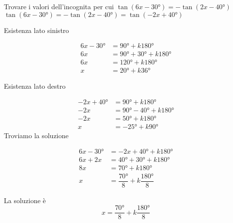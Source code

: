 \begin{exercise}
	Trovare i valori dell'incognita per cui $\tan(6x-\ang{30;;})=-\tan(2x-\ang{40;;})$
	\tcblower
	 $\tan(6x-\ang{30;;})=-\tan(2x-\ang{40;;})=\tan(-2x+\ang{40;;})$
	
	Esistenza lato sinistro
	
	\begin{align*}
		6x-\ang{30;;}&=\ang{90;;}+k\ang{180;;}\\
		6x&=\ang{90;;}+\ang{30;;}+k\ang{180;;}\\
		6x&=\ang{120;;}+k\ang{180;;}\\
		x&=\ang{20;;}+k\ang{36;;}
		\end{align*}
	
	Esistenza lato destro
	
	\begin{align*}
		-2x+\ang{40;;}&=\ang{90;;}+k\ang{180;;}\\
		-2x&=\ang{90;;}-\ang{40;;}+k\ang{180;;}\\
		-2x&=\ang{50;;}+k\ang{180;;}\\
		x&=-\ang{25;;}+k\ang{90;;}
		\end{align*}
	Troviamo la soluzione
	
		\begin{align*}
		6x-\ang{30;;}&=-2x+\ang{40;;}+k\ang{180;;}\\
		6x+2x&=\ang{40;;}+\ang{30;;}+k\ang{180;;}\\
		8x&=\ang{70;;}+k\ang{180;;}\\
		x&=\dfrac{\ang{70;;}}{8}+k\dfrac{\ang{180;;}}{8}
		\end{align*}
	
	La soluzione è
	\[x=\dfrac{\ang{70;;}}{8}+k\dfrac{\ang{180;;}}{8}\]
\end{exercise}
